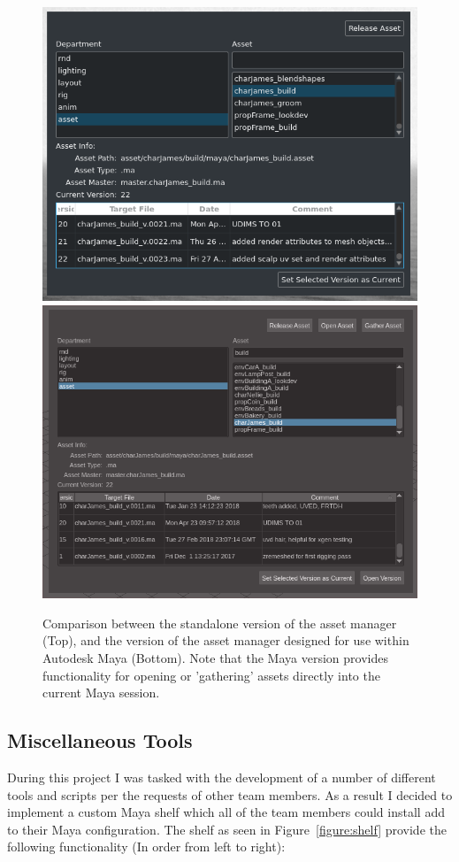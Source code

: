 \documentclass[11pt]{article}
\begin{document}
\begin{figure}[htbp]
\centering
\includegraphics[width=0.8\linewidth]{images/amStandalone.png}
\includegraphics[width=0.8\linewidth]{images/amGuiMaya.png}
\caption{\label{figure:assetManagerGui} Comparison between the standalone version of the asset manager (Top), and the version of the asset manager designed for use within Autodesk Maya (Bottom). Note that the Maya version provides functionality for opening or 'gathering' assets directly into the current Maya session.}
\end{figure}

\newpage

\subsection{Miscellaneous Tools}

During this project I was tasked with the development of a number of different tools and scripts per the requests of other team members. As a result I decided to implement a custom Maya shelf which all of the team members could install add to their Maya configuration. The shelf as seen in Figure~\ref{figure:shelf} provide the following functionality (In order from left to right):
\end{document}
